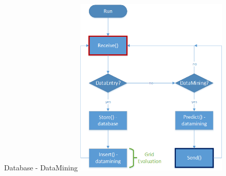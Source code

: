 	\begin{frame}{Database - DataMining}
	\includegraphics[width=0.55\textwidth]{images/datamining_flow3.png}
	\end{frame}
